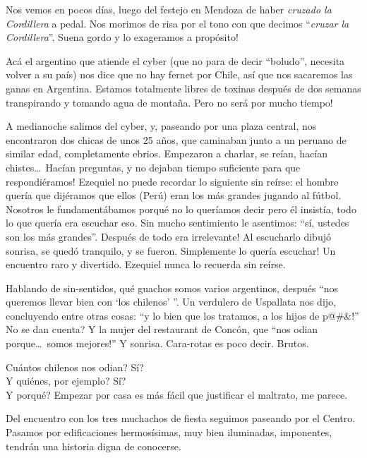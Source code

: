 Nos vemos en pocos d\'ias, luego del festejo en Mendoza de haber \emph{cruzado
la Cordillera} a pedal. Nos morimos de risa por el tono con que decimos
``\emph{cruzar la Cordillera}''. \textexclamdown Suena gordo y lo exageramos a
prop\'osito!

Ac\'a el argentino que atiende el cyber (que no para de decir ``boludo'',
necesita volver a su pa\'is) nos dice que no hay fernet por Chile, as\'i que nos
sacaremos las ganas en Argentina. Estamos totalmente libres de toxinas despu\'es
de dos semanas transpirando y tomando agua de monta\~na. \textexclamdown Pero no
ser\'a por mucho tiempo!

A medianoche salimos del cyber, y, paseando por una plaza central, nos
encontraron dos chicas de unos 25 a\~nos, que caminaban junto a un peruano de
similar edad, completamente ebrios. Empezaron a charlar, se re\'ian, hac\'ian
chistes\ldots\ \textexclamdown Hac\'ian preguntas, y no dejaban tiempo
suficiente para que respondi\'eramos! Ezequiel no puede recordar lo siguiente
sin re\'irse: el hombre quer\'ia que dij\'eramos que ellos (Per\'u) eran los
m\'as grandes jugando al f\'utbol. Nosotros le fundament\'abamos porqu\'e no lo
quer\'iamos decir pero \'el insist\'ia, todo lo que quer\'ia era escuchar eso.
Sin mucho sentimiento le asentimos: ``s\'i, ustedes son los m\'as grandes''.
\textexclamdown Despu\'es de todo era irrelevante! Al escucharlo dibuj\'o
sonrisa, se qued\'o tranquilo, y se fueron. \textexclamdown Simplemente lo
quer\'ia escuchar! Un encuentro raro y divertido. Ezequiel nunca lo recuerda sin
re\'irse.

Hablando de sin-sentidos, qu\'e guachos somos varios argentinos, despu\'es ``nos
queremos llevar bien con `los chilenos' ''. Un verdulero de Uspallata nos dijo,
concluyendo entre otras cosas: ``\textexclamdown y lo bien que los tratamos, a
los hijos de p@\#\&!'' \textquestiondown No se dan cuenta? Y la mujer del
restaurant de Conc\'on, que ``nos odian porque\ldots\ \textexclamdown somos
mejores!'' Y sonrisa. Cara-rotas es poco decir. Brutos.

\textquestiondown Cu\'antos chilenos nos odian? \textquestiondown S\'i?\\
\indent \textquestiondown Y qui\'enes, por ejemplo? \textquestiondown S\'i?\\
\indent \textquestiondown Y porqu\'e? Empezar por casa es m\'as f\'acil que
justificar el maltrato, me parece.

Del encuentro con los tres muchachos de fiesta seguimos paseando por el Centro.
Pasamos por edificaciones hermos\'isimas, muy bien iluminadas, imponentes,
tendr\'an una historia digna de conocerse.

